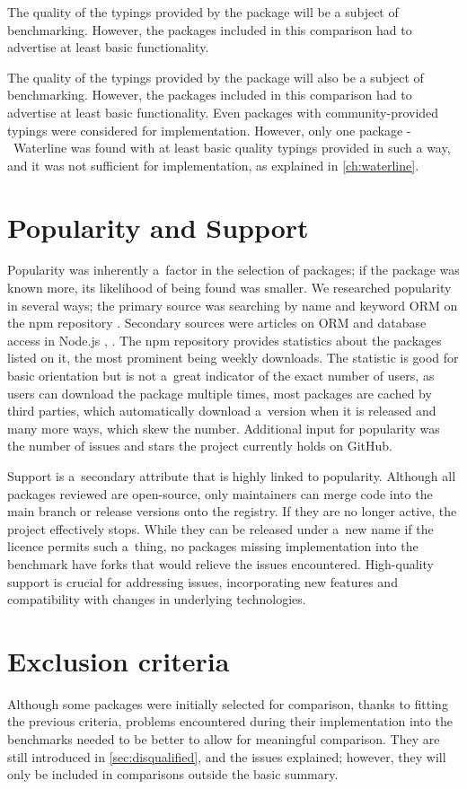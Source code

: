 The quality of the typings provided by the package will be a subject of
benchmarking. However, the packages included in this comparison had to advertise
at least basic functionality.

The quality of the typings provided by the package will also be a subject of
benchmarking. However, the packages included in this comparison had to advertise
at least basic functionality. Even packages with community-provided typings were
considered for implementation. However, only one package -~Waterline was found
with at least basic quality typings provided in such a way, and it was not
sufficient for implementation, as explained in \autoref{ch:waterline}.

\section{Popularity and Support}
Popularity was inherently a~factor in the selection of packages; if the package
was known more, its likelihood of being found was smaller. We researched
popularity in several ways; the primary source was searching by name and keyword
ORM on the npm repository \cite{npmSearchORM}. Secondary sources were articles
on ORM and database access in Node.js \cite{SitePoint_2021}, \cite{Wang_2020}.
The npm repository provides statistics about the packages listed on it, the most
prominent being weekly downloads. The statistic is good for basic orientation
but is not a~great indicator of the exact number of users, as users can download
the package multiple times, most packages are cached by third parties, which
automatically download a~version when it is released and many more ways, which
skew the number. Additional input for popularity was the number of issues and
stars the project currently holds on GitHub.

Support is a~secondary attribute that is highly linked to popularity. Although
all packages reviewed are open-source, only maintainers can merge code into the
main branch or release versions onto the registry. If they are no longer active,
the project effectively stops. While they can be released under a~new name if
the licence permits such a~thing, no packages missing implementation into the
benchmark have forks that would relieve the issues encountered. High-quality
support is crucial for addressing issues, incorporating new features and
compatibility with changes in underlying technologies.

\section{Exclusion criteria}
Although some packages were initially selected for comparison, thanks to fitting
the previous criteria, problems encountered during their implementation into the
benchmarks needed to be better to allow for meaningful comparison. They are
still introduced in \autoref{sec:disqualified}, and the issues explained;
however, they will only be included in comparisons outside the basic summary.

